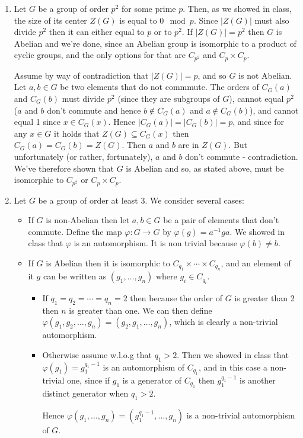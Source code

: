 \documentclass[11pt]{article} \usepackage{amssymb}
\renewcommand{\phi}{\varphi}
\begin{document}
\begin{enumerate}
\item
  Let $G$ be a group of order $p^2$ for some prime $p$. Then, as we showed in class,
  the size of its center $Z(G)$ is equal to $0\mod p$. Since $|Z(G)|$ must also
  divide $p^2$ then it can either equal to $p$ or to $p^2$. If $|Z(G)|=p^2$ then
  $G$ is Abelian and we're done, since an Abelian group is isomorphic  
  to a product of cyclic groups, and the only options for that 
  are $C_{p^2}$ and $C_p \times C_p$.

  Assume by way of contradiction that $|Z(G)|=p$, and so $G$ is not Abelian.
  Let $a,b \in G$ be two elements that do not commmute. The orders of $C_G(a)$
  and $C_G(b)$ must divide $p^2$ (since they are subgroups of $G$), 
  cannot equal $p^2$ ($a$ and $b$ don't commute and 
  hence $b \not \in C_G(a)$ and $a\not \in C_G(b)$), and cannot equal
  1 since $x\in C_G(x)$. Hence $|C_G(a)|=|C_G(b)|=p$, and since for any $x \in G$ it 
  holds that $Z(G)\subseteq C_G(x)$ then $C_G(a)=C_G(b)=Z(G)$. Then $a$ and $b$ are
  in $Z(G)$. But unfortunately (or rather, fortunately), $a$ and $b$ don't 
  commute - contradiction. We've therefore shown that $G$ is Abelian and
  so, as stated above, must be isomorphic to  $C_{p^2}$ or $C_p \times C_p$.

\item
  Let $G$ be a group of order at least 3. We consider several cases:
  \begin{itemize}
  \item 
    If $G$ is non-Abelian then let
    $a,b \in G$ be a pair of elements that don't commute. Define the map
    $\phi:G \to G$ by $\phi(g)=a^{-1}ga$. We showed in class that $\phi$ is an
    automorphism. It is non trivial because $\phi(b) \neq b$.
  \item
    If $G$ is Abelian then  it is isomorphic to 
    $C_{q_1} \times \cdots \times C_{q_n}$,
    and an element of it $g$ can be written as $(g_1,\ldots,g_n)$ where 
    $g_i \in C_{q_i}$. 
    \begin{itemize}
    \item 
      If $q_1=q_2=\cdots=q_n=2$ then because the order of $G$ is greater than 2 then
      $n$ is greater than one. We can then define 
      $\phi(g_1,g_2,\ldots,g_n)=(g_2,g_1,\ldots,g_n)$, which is clearly a 
      non-trivial automorphism. 
    \item 
      Otherwise assume w.l.o.g that $q_1>2$. Then we showed in class that
      $\phi(g_1)=g_1^{q_1-1}$ is an automorphism of $C_{q_1}$, and in this case a 
      non-trivial one, since if $g_1$ is a generator of $C_{q_1}$ then 
      $g_1^{q_1-1}$ is another distinct generator when $q_1>2$.

      Hence $\phi(g_1,\ldots,g_n)=(g_1^{q_1-1},\ldots,g_n)$ is a non-trivial
      automorphism of $G$.
    \end{itemize}
  \end{itemize}


  
\end{enumerate}
\end{document}
